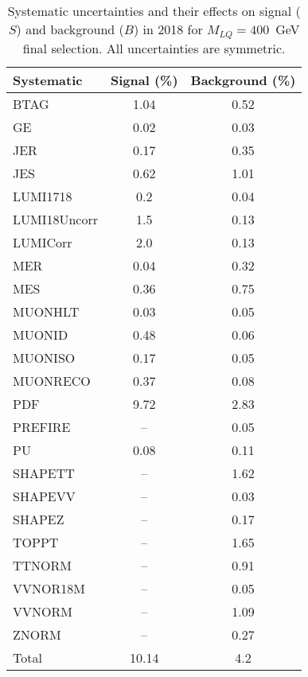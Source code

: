 \begin{table}[htbp]
\begin{center}
\caption{Systematic uncertainties and their effects on signal ($S$) and background ($B$) in 2018 for $M_{LQ}=400$~GeV final selection. All uncertainties are symmetric.}
\begin{tabular}{lcc}
\hline\hline
Systematic & Signal (\%) & Background (\%) \\ \hline 
BTAG & 1.04 & 0.52\\ 
GE & 0.02 & 0.03\\ 
JER & 0.17 & 0.35\\ 
JES & 0.62 & 1.01\\ 
LUMI1718 & 0.2 & 0.04\\ 
LUMI18Uncorr & 1.5 & 0.13\\ 
LUMICorr & 2.0 & 0.13\\ 
MER & 0.04 & 0.32\\ 
MES & 0.36 & 0.75\\ 
MUONHLT & 0.03 & 0.05\\ 
MUONID & 0.48 & 0.06\\ 
MUONISO & 0.17 & 0.05\\ 
MUONRECO & 0.37 & 0.08\\ 
PDF & 9.72 & 2.83\\ 
PREFIRE & -- & 0.05\\ 
PU & 0.08 & 0.11\\ 
SHAPETT & -- & 1.62\\ 
SHAPEVV & -- & 0.03\\ 
SHAPEZ & -- & 0.17\\ 
TOPPT & -- & 1.65\\ 
TTNORM & -- & 0.91\\ 
VVNOR18M & -- & 0.05\\ 
VVNORM & -- & 1.09\\ 
ZNORM & -- & 0.27\\ 
Total & 10.14 & 4.2\\ \hline \hline
\end{tabular}
\label{tab:SysUncertainties_uujj_400}
\end{center}
\end{table}

